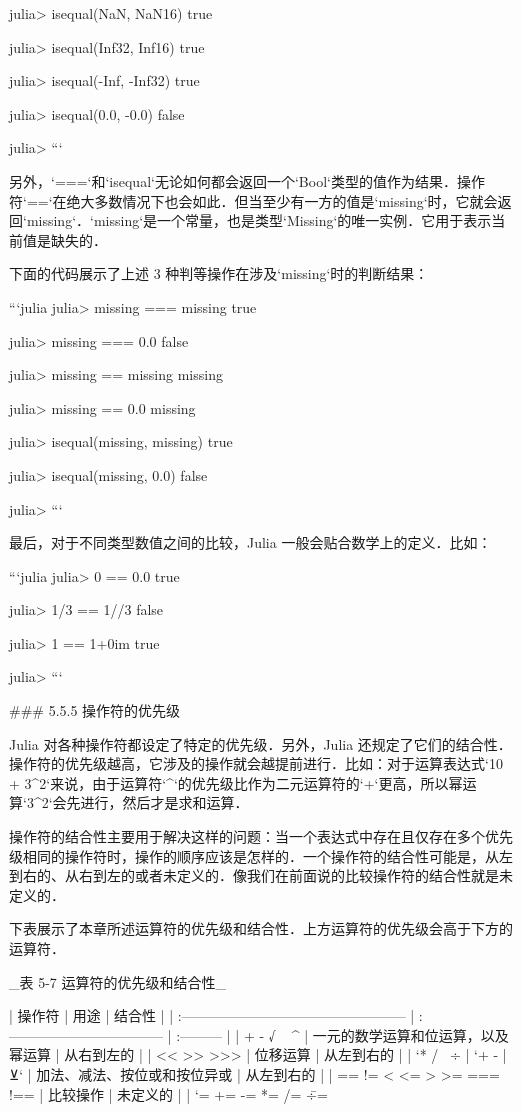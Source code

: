 julia> isequal(NaN, NaN16)
true

julia> isequal(Inf32, Inf16)
true

julia> isequal(-Inf, -Inf32)
true

julia> isequal(0.0, -0.0)
false

julia> 
```

另外，`===`和`isequal`无论如何都会返回一个`Bool`类型的值作为结果．操作符`==`在绝大多数情况下也会如此．但当至少有一方的值是`missing`时，它就会返回`missing`．`missing`是一个常量，也是类型`Missing`的唯一实例．它用于表示当前值是缺失的．

下面的代码展示了上述 3 种判等操作在涉及`missing`时的判断结果：

```julia
julia> missing === missing
true

julia> missing === 0.0
false

julia> missing == missing
missing

julia> missing == 0.0
missing

julia> isequal(missing, missing)
true

julia> isequal(missing, 0.0)
false

julia> 
```

最后，对于不同类型数值之间的比较，Julia 一般会贴合数学上的定义．比如：

```julia
julia> 0 == 0.0
true

julia> 1/3 == 1//3
false

julia> 1 == 1+0im
true

julia> 
```

### 5.5.5 操作符的优先级

Julia 对各种操作符都设定了特定的优先级．另外，Julia 还规定了它们的结合性．操作符的优先级越高，它涉及的操作就会越提前进行．比如：对于运算表达式`10 + 3^2`来说，由于运算符`^`的优先级比作为二元运算符的`+`更高，所以幂运算`3^2`会先进行，然后才是求和运算．

操作符的结合性主要用于解决这样的问题：当一个表达式中存在且仅存在多个优先级相同的操作符时，操作的顺序应该是怎样的．一个操作符的结合性可能是，从左到右的、从右到左的或者未定义的．像我们在前面说的比较操作符的结合性就是未定义的．

下表展示了本章所述运算符的优先级和结合性．上方运算符的优先级会高于下方的运算符．

_表 5-7 运算符的优先级和结合性_

| 操作符                                            | 用途                               | 结合性     |
| :------------------------------------------------ | :--------------------------------- | :--------- |
| + - √ ~ ^                                         | 一元的数学运算和位运算，以及幂运算 | 从右到左的 |
| << >> >>>                                         | 位移运算                           | 从左到右的 |
| `* / \ ÷ %
| `+ - | ⊻`                                         | 加法、减法、按位或和按位异或       | 从左到右的 |
| == != < <= > >= === !==                           | 比较操作                           | 未定义的   |
| `= += -= *= /= \= ÷= %

